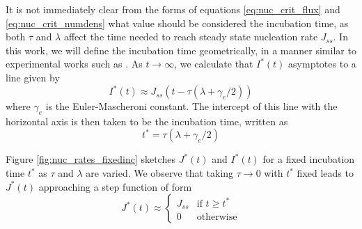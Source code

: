 It is not immediately clear from the forms of equations \ref{eq:nuc_crit_flux} and \ref{eq:nuc_crit_numdens} what value should be considered the incubation time, as both $\tau$ and $\lambda$ affect the time needed to reach steady state nucleation rate $J_{ss}$. In this work, we will define the incubation time geometrically, in a manner similar to experimental works such as \cite{legoues84}. As $t \rightarrow \infty$, we calculate that $I^*(t)$ asymptotes to a line given by
\begin{equation}\label{eq:nuc_crit_numdens_asymptote}
I^*(t) \approx J_{ss} ( t - \tau(\lambda+\gamma_{e}/2) )
\end{equation}
where $\gamma_{e}$ is the Euler-Mascheroni constant. The intercept of this line with the horizontal axis is then taken to be the incubation time, written as
\begin{equation}\label{eq:nuc_incubationtime}
t^*=\tau(\lambda+\gamma_{e}/2)
\end{equation}

Figure \ref{fig:nuc_rates_fixedinc} sketches $J^*(t)$ and $I^*(t)$ for a fixed incubation time $t^*$ as $\tau$ and $\lambda$ are varied. We observe that taking $\tau \rightarrow 0$ with $t^*$ fixed leads to $J^*(t)$ approaching a step function of form
\begin{equation}
J^*(t)\approx
\begin{cases}
    J_{ss}& \text{if } t\geq t^*\\
    0              & \text{otherwise}
\end{cases}
\end{equation}

